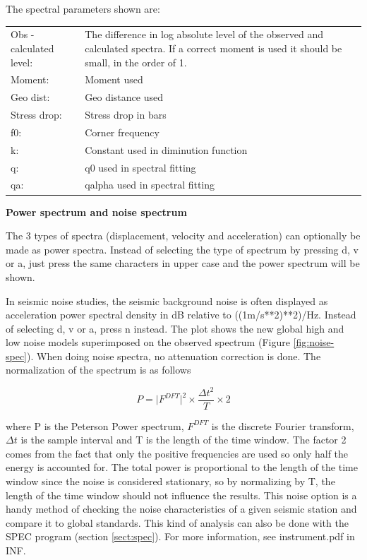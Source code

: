 The spectral parameters shown are: 

\begin{tabular}{|lp{9cm}|}
\hline
Obs - calculated level: & The difference in log absolute level of the observed and calculated  
spectra. If a correct moment is used it should be small, 
in the order of 1. \\
Moment: & Moment used \\
Geo dist: & Geo distance used \\
Stress drop: & Stress drop in bars \\
f0: & Corner frequency \\
k: & Constant used in diminution function \\
q: & q0 used in spectral fitting \\
qa: & qalpha used in spectral fitting \\
\hline
\end{tabular}
\newline

\textbf{Power spectrum and noise spectrum}

The 3 types of spectra (displacement, velocity and acceleration) can optionally be made as power spectra. Instead of selecting the type of spectrum by pressing d, v or a, just press the same characters in upper case and the power spectrum will be shown. 

In seismic noise studies, the seismic background noise is often displayed 
as acceleration power spectral density in dB relative to ((1m/s**2)**2)/Hz. 
Instead of selecting d, v or a, press n instead.  The plot shows the 
\citet{peterson1993}
 new global high and 
low noise models superimposed on the observed spectrum (Figure \ref{fig:noise-spec}). 
When doing noise spectra, no attenuation correction is done. The 
normalization of the spectrum is as follows 

\begin{displaymath}
P = \vert F^{DFT} \vert^{2} \times \frac{\Delta t^{2}}{T} \times 2
\end{displaymath}

where P is the Peterson Power spectrum, $F^{DFT}$ is the discrete 
Fourier transform, $\Delta t$ is the sample interval and T is the 
length of the time window. The factor 2 comes from the fact that 
only the positive frequencies are used so only half the energy is 
accounted for. The total power is proportional to the length of the 
time window since the noise is considered stationary, so by normalizing 
by T, the length of the time window should not influence the results. 
This noise option is a handy method of checking the noise characteristics 
of a given seismic station and compare it to global standards. This 
kind of analysis can also be done with the SPEC program 
(section \ref{sect:spec}). %
For more information, see instrument.pdf in INF. 

